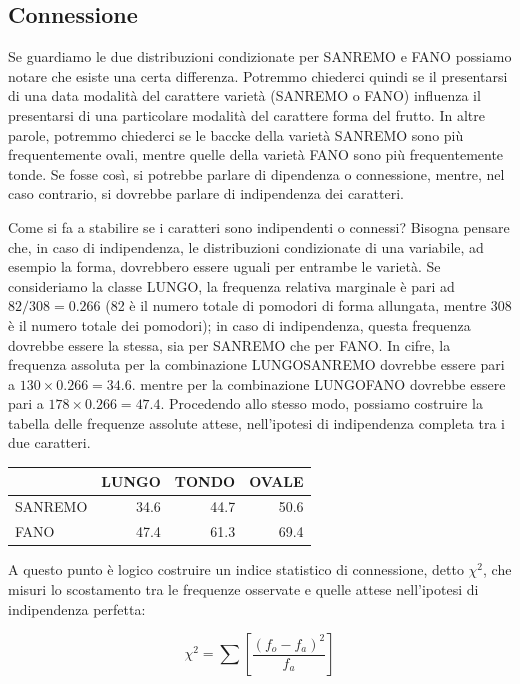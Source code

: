 \documentclass[a4paper,12pt,oneside]{book}
\begin{document}
\hypertarget{connessione}{%
\subsection{Connessione}\label{connessione}}

Se guardiamo le due distribuzioni condizionate per SANREMO e FANO possiamo notare che esiste una certa differenza. Potremmo chiederci quindi se il presentarsi di una data modalità del carattere varietà (SANREMO o FANO) influenza il presentarsi di una particolare modalità del carattere forma del frutto. In altre parole, potremmo chiederci se le baccke della varietà SANREMO sono più frequentemente ovali, mentre quelle della varietà FANO sono più frequentemente tonde. Se fosse così, si potrebbe parlare di dipendenza o connessione, mentre, nel caso contrario, si dovrebbe parlare di indipendenza dei caratteri.

Come si fa a stabilire se i caratteri sono indipendenti o connessi? Bisogna pensare che, in caso di indipendenza, le distribuzioni condizionate di una variabile, ad esempio la forma, dovrebbero essere uguali per entrambe le varietà. Se consideriamo la classe LUNGO, la frequenza relativa marginale è pari ad \(82/308 = 0.266\) (82 è il numero totale di pomodori di forma allungata, mentre 308 è il numero totale dei pomodori); in caso di indipendenza, questa frequenza dovrebbe essere la stessa, sia per SANREMO che per FANO. In cifre, la frequenza assoluta per la combinazione LUNGO\textbar SANREMO dovrebbe essere pari a \(130 \times 0.266 =34.6\). mentre per la combinazione LUNGO\textbar FANO dovrebbe essere pari a \(178 \times 0.266=47.4\). Procedendo allo stesso modo, possiamo costruire la tabella delle frequenze assolute attese, nell'ipotesi di indipendenza completa tra i due caratteri.

\begin{tabular}{l|r|r|r}
\hline
  & LUNGO & TONDO & OVALE\\
\hline
SANREMO & 34.6 & 44.7 & 50.6\\
\hline
FANO & 47.4 & 61.3 & 69.4\\
\hline
\end{tabular}

A questo punto è logico costruire un indice statistico di connessione, detto \(\chi^2\), che misuri lo scostamento tra le frequenze osservate e quelle attese nell'ipotesi di indipendenza perfetta:

\[\chi ^2  = \sum \left[ \frac{\left( {f_o  - f_a } \right)^2 }{f_a } \right]\]
\end{document}
